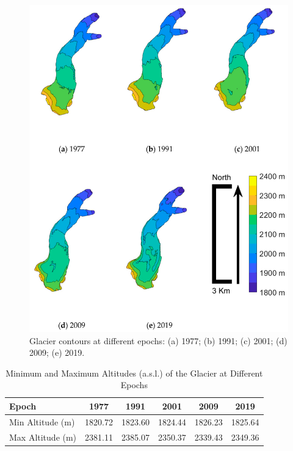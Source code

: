 \begin{figure}
    \centering
    \includegraphics[height=0.90\textheight]{results_contours.png}
    \caption{Glacier contours at different epochs: (a) 1977; (b) 1991; (c) 2001; (d) 2009; (e) 2019.}
    \label{fig:2:results_contour}
\end{figure}

\begin{table}
  \centering
  \caption{Minimum and Maximum Altitudes (a.s.l.) of the Glacier at Different Epochs}
  \label{tab:2:glacier_altitudes}
  \begin{tabular}{lccccc}
    \hline
    Epoch & 1977 & 1991 & 2001 & 2009 & 2019 \\
    \hline
    Min Altitude (m) & 1820.72 & 1823.60 & 1824.44 & 1826.23 & 1825.64 \\
    Max Altitude (m) & 2381.11 & 2385.07 & 2350.37 & 2339.43 & 2349.36 \\
    \hline
  \end{tabular}
\end{table}

